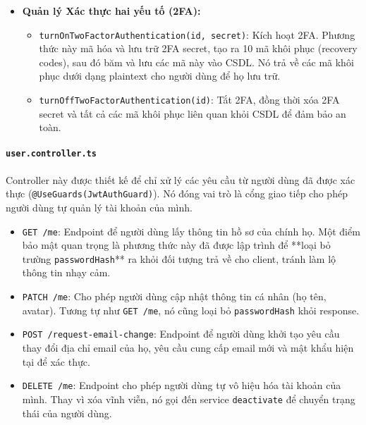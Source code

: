 \begin{itemize}
    \item \textbf{Quản lý Xác thực hai yếu tố (2FA):}
    \begin{itemize}
        \item \texttt{turnOnTwoFactorAuthentication(id, secret)}: Kích hoạt 2FA. Phương thức này mã hóa và lưu trữ 2FA secret, tạo ra 10 mã khôi phục (recovery codes), sau đó băm và lưu các mã này vào CSDL. Nó trả về các mã khôi phục dưới dạng plaintext cho người dùng để họ lưu trữ.
        \item \texttt{turnOffTwoFactorAuthentication(id)}: Tắt 2FA, đồng thời xóa 2FA secret và tất cả các mã khôi phục liên quan khỏi CSDL để đảm bảo an toàn.
    \end{itemize}
\end{itemize}

\paragraph{\texttt{user.controller.ts}}
Controller này được thiết kế để chỉ xử lý các yêu cầu từ người dùng đã được xác thực (\texttt{@UseGuards(JwtAuthGuard)}). Nó đóng vai trò là cổng giao tiếp cho phép người dùng tự quản lý tài khoản của mình.

\begin{itemize}
    \item \texttt{GET /me}: Endpoint để người dùng lấy thông tin hồ sơ của chính họ. Một điểm bảo mật quan trọng là phương thức này đã được lập trình để **loại bỏ trường \texttt{passwordHash}** ra khỏi đối tượng trả về cho client, tránh làm lộ thông tin nhạy cảm.
    
    \item \texttt{PATCH /me}: Cho phép người dùng cập nhật thông tin cá nhân (họ tên, avatar). Tương tự như \texttt{GET /me}, nó cũng loại bỏ \texttt{passwordHash} khỏi response.
    
    \item \texttt{POST /request-email-change}: Endpoint để người dùng khởi tạo yêu cầu thay đổi địa chỉ email của họ, yêu cầu cung cấp email mới và mật khẩu hiện tại để xác thực.
    
    \item \texttt{DELETE /me}: Endpoint cho phép người dùng tự vô hiệu hóa tài khoản của mình. Thay vì xóa vĩnh viễn, nó gọi đến service \texttt{deactivate} để chuyển trạng thái của người dùng.
\end{itemize}